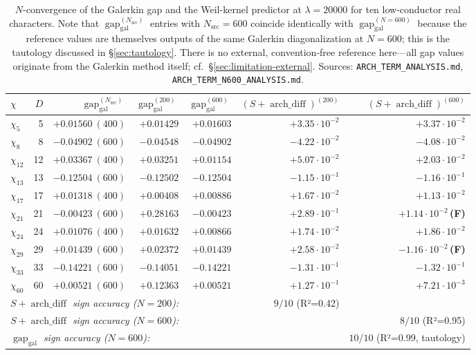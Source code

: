 \documentclass[10pt,twocolumn]{article}
\theoremstyle{definition}
\theoremstyle{remark}
\newcommand{\gap}{\operatorname{gap}}
\newcommand{\chifn}{\chi}
\newcommand{\archdiff}{\operatorname{arch\_diff}}
\begin{document}
\begin{table}[t]
\caption{$N$-convergence of the Galerkin gap and the Weil-kernel predictor
  at $\lambda=20000$ for ten low-conductor real characters. Note that
  $\gap_{\mathrm{gal}}^{(N_{\mathrm{src}})}$ entries with $N_{\mathrm{src}}=600$
  coincide identically with $\gap_{\mathrm{gal}}^{(N=600)}$ because the
  reference values are themselves outputs of the same Galerkin
  diagonalization at $N=600$; this is the tautology discussed in
  \S\ref{sec:tautology}. There is no external, convention-free
  reference here---all gap values originate from the Galerkin method
  itself; cf.\ \S\ref{sec:limitation-external}.
  Sources: \texttt{ARCH\_TERM\_ANALYSIS.md}, \texttt{ARCH\_TERM\_N600\_ANALYSIS.md}.}
\label{tab:validation}
\centering
\small
\begin{tabular}{@{}lrrrrrr@{}}
\toprule
$\chifn$ & $D$ & $\gap_{\mathrm{gal}}^{(N_\mathrm{src})}$ & $\gap_{\mathrm{gal}}^{(200)}$ & $\gap_{\mathrm{gal}}^{(600)}$ & $(S+\archdiff)^{(200)}$ & $(S+\archdiff)^{(600)}$ \\
\midrule
$\chi_5$  &  5 & $+0.01560\ (400)$ & $+0.01429$ & $+0.01603$ & $+3.35\!\cdot\!10^{-2}$ & $+3.37\!\cdot\!10^{-2}$ \\
$\chi_8$  &  8 & $-0.04902\ (600)$ & $-0.04548$ & $-0.04902$ & $-4.22\!\cdot\!10^{-2}$ & $-4.08\!\cdot\!10^{-2}$ \\
$\chi_{12}$ & 12 & $+0.03367\ (400)$ & $+0.03251$ & $+0.01154$ & $+5.07\!\cdot\!10^{-2}$ & $+2.03\!\cdot\!10^{-2}$ \\
$\chi_{13}$ & 13 & $-0.12504\ (600)$ & $-0.12502$ & $-0.12504$ & $-1.15\!\cdot\!10^{-1}$ & $-1.16\!\cdot\!10^{-1}$ \\
$\chi_{17}$ & 17 & $+0.01318\ (400)$ & $+0.00408$ & $+0.00886$ & $+1.67\!\cdot\!10^{-2}$ & $+1.13\!\cdot\!10^{-2}$ \\
$\chi_{21}$ & 21 & $-0.00423\ (600)$ & $\mathbf{+0.28163}$ & $-0.00423$ & $+2.89\!\cdot\!10^{-1}$ & $+1.14\!\cdot\!10^{-2}$\,\textbf{(F)} \\
$\chi_{24}$ & 24 & $+0.01076\ (400)$ & $+0.01632$ & $+0.00866$ & $+1.74\!\cdot\!10^{-2}$ & $+1.86\!\cdot\!10^{-2}$ \\
$\chi_{29}$ & 29 & $+0.01439\ (600)$ & $+0.02372$ & $+0.01439$ & $+2.58\!\cdot\!10^{-2}$ & $-1.16\!\cdot\!10^{-2}$\,\textbf{(F)} \\
$\chi_{33}$ & 33 & $-0.14221\ (600)$ & $-0.14051$ & $-0.14221$ & $-1.31\!\cdot\!10^{-1}$ & $-1.32\!\cdot\!10^{-1}$ \\
$\chi_{60}$ & 60 & $+0.00521\ (600)$ & $+0.12363$ & $+0.00521$ & $+1.27\!\cdot\!10^{-1}$ & $+7.21\!\cdot\!10^{-3}$ \\
\midrule
\multicolumn{4}{l}{\textit{$S+\archdiff$ sign accuracy ($N=200$):}} & & $9/10$ (R²=0.42) & \\
\multicolumn{4}{l}{\textit{$S+\archdiff$ sign accuracy ($N=600$):}} & & & $8/10$ (R²=0.95) \\
\multicolumn{4}{l}{\textit{$\gap_{\mathrm{gal}}$ sign accuracy ($N=600$):}} & & & $10/10$ (R²=0.99, tautology) \\
\bottomrule
\end{tabular}
\end{table}
\end{document}
